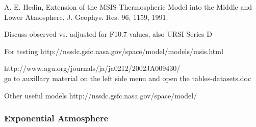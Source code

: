 A. E. Hedin, Extension of the MSIS Thermospheric Model into the
Middle and Lower Atmosphere, J. Geophys. Res. 96, 1159, 1991.

Discuss observed vs. adjusted for F10.7 values, also URSI Series D

For testing http://nssdc.gsfc.nasa.gov/space/model/models/msis.html

http://www.agu.org/journals/ja/ja0212/2002JA009430/ \\
go to auxillary material on the left side menu and open the
tables-datasets.doc

Other useful models http://nssdc.gsfc.nasa.gov/space/model/

\subsubsection{Exponential Atmosphere}
